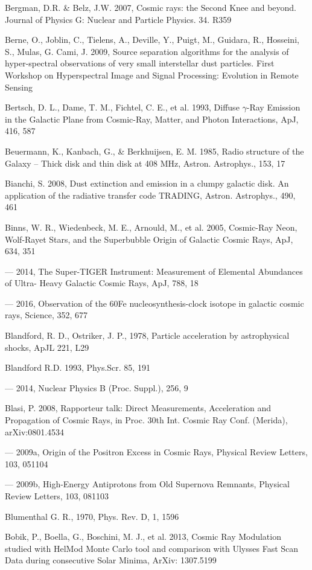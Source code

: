 Bergman, D.R. \& Belz, J.W. 2007, Cosmic rays: the Second Knee and beyond. Journal of Physics G: Nuclear and Particle Physics. 34. R359

Berne, O., Joblin, C., Tielens, A., Deville, Y., Puigt, M., Guidara, R., Hosseini, S., Mulas, G. Cami, J. 2009, Source separation algorithms for the analysis of hyper-spectral observations of very small interstellar dust particles. First Workshop on Hyperspectral Image and Signal Processing: Evolution in Remote Sensing

Bertsch, D. L., Dame, T. M., Fichtel, C. E., et al. 1993, Diffuse $\gamma$-Ray Emission in the Galactic Plane from Cosmic-Ray, Matter, and Photon Interactions, ApJ, 416, 587

Beuermann, K., Kanbach, G., \& Berkhuijsen, E. M. 1985, Radio structure of the Galaxy -- Thick disk and thin disk at 408 MHz, Astron. Astrophys., 153, 17

Bianchi, S. 2008, Dust extinction and emission in a clumpy galactic disk. An application of the radiative transfer code TRADING, Astron. Astrophys., 490, 461

Binns, W. R., Wiedenbeck, M. E., Arnould, M., et al. 2005, Cosmic-Ray Neon, Wolf-Rayet Stars, and the Superbubble Origin of Galactic Cosmic Rays, ApJ, 634, 351

--- 2014, The Super-TIGER Instrument: Measurement of Elemental Abundances of Ultra- Heavy Galactic Cosmic Rays, ApJ, 788, 18

--- 2016, Observation of the 60Fe nucleosynthesis-clock isotope in galactic cosmic rays, Science, 352, 677

Blandford, R. D., Ostriker, J. P., 1978, Particle acceleration by astrophysical shocks, ApJL 221, L29 

Blandford R.D. 1993, Phys.Scr. 85, 191

--- 2014, Nuclear Physics B (Proc. Suppl.), 256, 9

Blasi, P. 2008, Rapporteur talk: Direct Measurements, Acceleration and Propagation of Cosmic Rays, in Proc. 30th Int. Cosmic Ray Conf. (Merida), arXiv:0801.4534

--- 2009a, Origin of the Positron Excess in Cosmic Rays, Physical Review Letters, 103, 051104

--- 2009b, High-Energy Antiprotons from Old Supernova Remnants, Physical Review Letters, 103, 081103

Blumenthal G. R., 1970, Phys. Rev. D, 1, 1596

Bobik, P., Boella, G., Boschini, M. J., et al. 2013, Cosmic Ray Modulation studied with HelMod Monte Carlo tool and comparison with Ulysses Fast Scan Data during consecutive Solar Minima, ArXiv: 1307.5199

